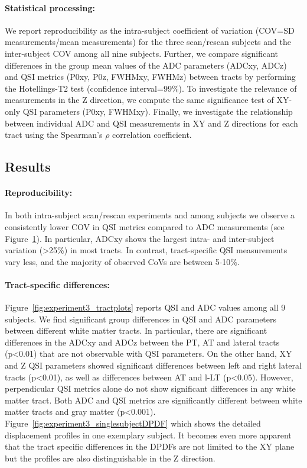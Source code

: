 \paragraph{Statistical processing:} We report reproducibility as the intra-subject coefficient of variation (COV=SD measurements/mean measurements) for the three scan/rescan subjects and the inter-subject COV among all nine subjects. Further, we compare significant differences in the group mean values of the ADC parameters (ADCxy, ADCz) and QSI metrics (P0xy, P0z, FWHMxy, FWHMz) between tracts by performing the Hotellings-T2 test (confidence interval=99\%). To investigate the relevance of measurements in the Z direction, we compute the same significance test of XY-only QSI parameters (P0xy, FWHMxy). Finally, we investigate the relationship between individual ADC and QSI measurements in XY and Z directions for each tract using the Spearman’s $\rho$ correlation coefficient. 
\subsection*{Results} 

\begin{figure}
  \centering
  \label{fig:experiment3_QSIvariations}
\end{figure}

\paragraph{Reproducibility:} In both intra-subject scan/rescan experiments and among subjects we observe a consistently lower COV in QSI metrics compared to ADC measurements (see Figure~\ref{fig:experiment3_QSIvariations}). In particular, ADCxy shows the largest intra- and inter-subject variation (>25\%) in most tracts. In contrast, tract-specific QSI measurements vary less, and the majority of observed CoVs are between 5-10\%. 
\paragraph{Tract-specific differences:} Figure~\ref{fig:experiment3_tractplots} reports QSI and ADC values among all 9 subjects. We find significant group differences in QSI and ADC parameters between different white matter tracts. In particular, there are significant differences in the ADCxy and ADCz between the PT, AT and lateral tracts (p<0.01) that are not observable with QSI parameters. On the other hand, XY and Z QSI parameters showed significant differences between left and right lateral tracts (p<0.01), as well as differences between AT and l-LT (p<0.05). However, perpendicular QSI metrics alone do not show significant differences in any white matter tract. Both ADC and QSI metrics are significantly different between white matter tracts and gray matter (p<0.001). Figure~\ref{fig:experiment3_singlesubjectDPDF} which shows the detailed displacement profiles in one exemplary subject. It becomes even more apparent that the tract specific differences in the DPDFs are not limited to the XY plane but the profiles are also distinguishable in the Z direction.

